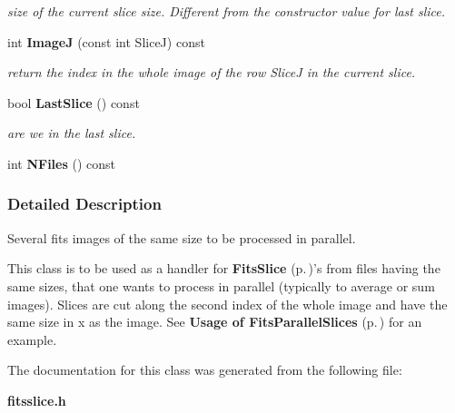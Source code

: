 \begin{CompactItemize}
\begin{CompactList}\small\item\em size of the current slice size. Different from the constructor value for last slice.\item\end{CompactList}\item 
{}
int {\bf Image\-J} (const int Slice\-J) const\label{class_fitsparallelslices_a5}

\begin{CompactList}\small\item\em return the index in the whole image of the row Slice\-J in the current slice.\item\end{CompactList}\item 
{}
bool {\bf Last\-Slice} () const\label{class_fitsparallelslices_a6}

\begin{CompactList}\small\item\em are we in the last slice.\item\end{CompactList}\item 
{}
int {\bf NFiles} () const\label{class_fitsparallelslices_a7}

\end{CompactItemize}


\subsubsection{Detailed Description}
Several fits images of the same size to be processed in parallel.

This class is to be used as a handler for {\bf Fits\-Slice} {\rm (p.\,\pageref{class_fitsslice})}'s from files having the same sizes, that one wants to process in parallel (typically to average or sum images). Slices are cut along the second index of the whole image  and have the same size in x as the image.  See {\bf Usage of Fits\-Parallel\-Slices} {\rm (p.\,\pageref{example_slices})} for an example. 



The documentation for this class was generated from the following file:\begin{CompactItemize}
\item 
{\bf fitsslice.h}\end{CompactItemize}
